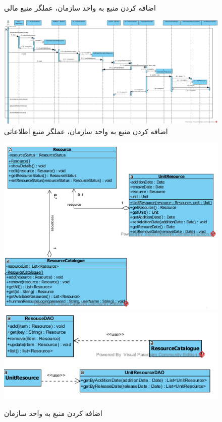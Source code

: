 \begin{landscape}
\begin{figure}[H]
	\caption{اضافه کردن منبع به واحد سازمان، عملگر منبع مالی}
\end{figure}
\begin{figure}[H]
	\centering
	\includegraphics[scale=0.5]{img/sequence-design/AddResourceToUnit_INFORMATION}
	\caption{اضافه کردن منبع به واحد سازمان، عملگر منبع اطلاعاتی}
\end{figure}

\begin{figure}[H]
	\centering
	\includegraphics[scale=0.9]{img/sequence-design/AddResourceToUnitC}
	\includegraphics[scale=0.9]{img/sequence-design/AddResourceToUnitD}	
	\caption{اضافه کردن منبع به واحد سازمان}
\end{figure}



\end{landscape}
